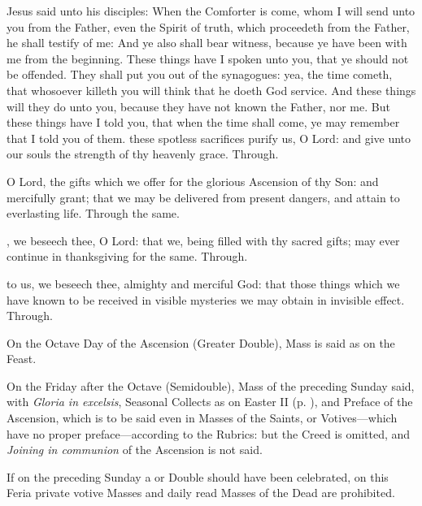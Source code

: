  Jesus said unto his disciples: When the Comforter is come, whom I will send unto you from the Father, even the Spirit of truth, which proceedeth from the Father, he shall testify of me: And ye also shall bear witness, because ye have been with me from the beginning. These things have I spoken unto you, that ye should not be offended. They shall put you out of the synagogues: yea, the time cometh, that whosoever killeth you will think that he doeth God service. And these things will they do unto you, because they have not known the Father, nor me. But these things have I told you, that when the time shall come, ye may remember that I told you of them.
\secret
{} these spotless sacrifices purify us, O Lord: and give unto our souls the strength of thy heavenly grace. Through.\\
\par{}
 O Lord, the gifts which we offer for the glorious Ascension of thy Son: and mercifully grant; that we may be delivered from present dangers, and attain to everlasting life. Through the same.

\postcommunion
{}, we beseech thee, O Lord: that we, being filled with thy sacred gifts; may ever continue in thanksgiving for the same. Through.\\
\par{}
 to us, we beseech thee, almighty and merciful God: that those things which we have known to be received in visible mysteries we may obtain in invisible effect. Through.
\begin{rubric}
    On the Octave Day of the Ascension (Greater Double), Mass is said as on the Feast.
\end{rubric}
\begin{rubric}
    On the Friday after the Octave (Semidouble), Mass of the preceding Sunday said, with \emph{Gloria in excelsis}, Seasonal Collects as on Easter II (p. \pageref{EasterII}), and Preface of the Ascension, which is to be said even in Masses of the Saints, or Votives---which have no proper preface---according to the Rubrics: but the Creed is omitted, and \emph{Joining in communion} of the Ascension is not said.
\end{rubric}
\begin{rubric}
    If on the preceding Sunday a  or  Double should have been celebrated, on this Feria private votive Masses and daily read Masses of the Dead are prohibited.
\end{rubric}

